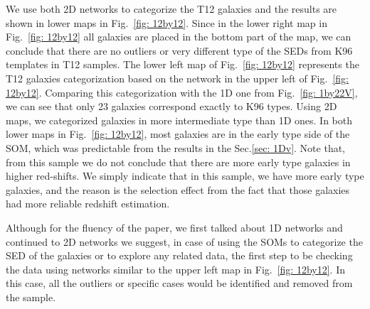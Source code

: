     We use both 2D networks to categorize the T12 galaxies and the results are shown in lower maps in Fig.~\ref{fig: 12by12}.
    Since in the lower right map in Fig.~\ref{fig: 12by12} all galaxies are placed in the bottom part of the map, we can conclude that there are no outliers or very different type of the SEDs from K96 templates in T12 samples.
    The lower left map of Fig.~\ref{fig: 12by12} represents the T12 galaxies categorization based on the network in the upper left of Fig.~\ref{fig: 12by12}. 
    Comparing this categorization with the 1D one from Fig.~\ref{fig: 1by22V}, we can see that only 23 galaxies correspond exactly to K96 types.
    Using 2D maps, we categorized galaxies in more intermediate type than 1D ones.
    In both lower maps in Fig.~\ref{fig: 12by12}, most galaxies are in the early type side of the SOM, which was predictable from the results in the Sec.\ref{sec: 1Dv}.
    Note that, from this sample we do not conclude that there are more early type galaxies in higher red-shifts.
    We simply indicate that in this sample, we have more early type galaxies, and the reason is the selection effect from the fact that those galaxies had more reliable redshift estimation.
    
    Although for the fluency of the paper, we first talked about 1D networks and continued to 2D networks we suggest, in case of using the SOMs to categorize the SED of the galaxies or to explore any related data, the first step to be checking the data using networks similar to the upper left map in Fig.~\ref{fig: 12by12}.
    In this case, all the outliers or specific cases would be identified and removed from the sample. 

    
 
